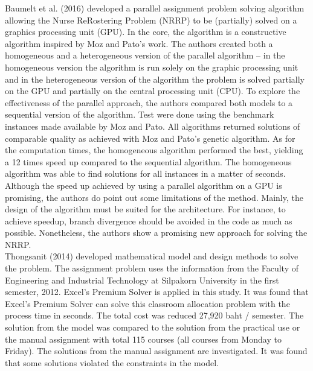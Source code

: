 \documentclass[11pt]{report}
\newcommand{\NI}{\noindent}
\begin{document}
	\NI Baumelt et al. (2016) developed a parallel assignment problem solving algorithm allowing the Nurse ReRostering Problem (NRRP) to be (partially) solved on a graphics processing unit (GPU). In the core, the algorithm is a constructive algorithm inspired by Moz and Pato’s work. The authors created both a homogeneous and a heterogeneous version of the parallel algorithm – in the homogeneous version the algorithm is run solely on the graphic processing unit and in the heterogeneous version of the algorithm the problem is solved partially on the GPU and partially
	on the central processing unit (CPU). To explore the effectiveness of the parallel approach, the authors compared both models to a sequential version of the algorithm. Test were done using the benchmark instances made available by Moz and Pato. All algorithms returned solutions of comparable quality as achieved with Moz and Pato’s genetic algorithm. As for the computation times, the homogeneous algorithm performed the best, yielding a 12 times speed up compared to the sequential algorithm. The homogeneous algorithm was able to find solutions for all instances in a matter of seconds. Although the speed up achieved by using a parallel algorithm
	on a GPU is promising, the authors do point out some limitations of the method. Mainly, the design of the algorithm must be suited for the architecture. For instance, to achieve speedup, branch divergence should be avoided in the code as much as possible. Nonetheless, the authors show a
	promising new approach for solving the NRRP.\\
	
	\NI Thongsanit (2014) developed mathematical model and design methods to solve the problem. The assignment problem uses the information from the Faculty of Engineering and Industrial
	Technology at Silpakorn University in the first semester, 2012. Excel’s Premium Solver is applied in this study. It was found that Excel’s Premium Solver can solve this classroom allocation problem with the process time in seconds. The total cost was reduced 27,920 baht / semester. The solution
	from the model was compared to the solution from the practical use or the manual assignment with total 115 courses (all courses from Monday to Friday). The solutions from the manual assignment are investigated. It was found that some solutions violated the constraints in the model.\\
	
\end{document}

